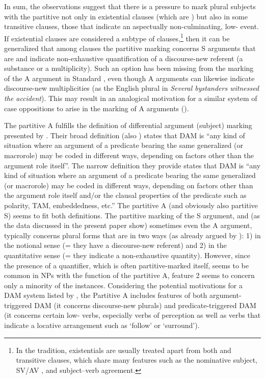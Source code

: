 \documentclass[output=paper]{LSP/langsci}
\begin{document}
In sum, the observations suggest that there is a pressure to mark  plural subjects with the partitive not only in existential clauses (which are ) but also in some transitive clauses, \ie those that indicate an aspectually non-culminating, low- event. If existential clauses are considered a subtype of  clauses,\footnote{In the  tradition, existentials are usually treated apart from both  and transitive clauses, which share many features such as the nominative subject, SV/AV , and subject–verb agreement.} then it can be generalized that among  clauses the partitive marking concerns S arguments that are  and indicate non-exhaustive quantification of a discourse-new referent (a substance or a multiplicity). Such an option has been missing from the marking of the A argument in Standard , even though A arguments can likewise indicate discourse-new multiplicities (as the English  plural in \textit{Several bystanders witnessed the accident}). This may result in an analogical motivation for a similar system of case oppositions to arise in the marking of A arguments (\cf \citealt[336–338]{Serzant2013Rise}).

The  partitive A fulfills the definition of differential argument (subject) marking presented by . Their broad definition (\cf also \citealt{Woolford2008Differential}) states that DAM is “any kind of situation where an argument of a predicate bearing the same generalized  (or macrorole) may be coded in different ways, depending on factors other than the argument role itself”. The narrow definition they provide states that DAM is “any kind of situation where an argument of a predicate bearing the same generalized  (or macrorole) may be coded in different ways, depending on factors other than the argument role itself and/or the clausal properties of the predicate such as polarity, TAM, embeddedness, etc.” The  partitive A (and obviously also partitive S) seems to fit both definitions. The partitive marking of the S argument, and (as the data discussed in the present paper show) sometimes even the A argument, typically concerns plural forms that are  in two ways (as already argued by \citealt{Siro1957Suomen}): 1) in the notional sense (= they have a discourse-new referent) and 2) in the quantitative sense (= they indicate a non-exhaustive quantity). However, since the presence of a quantifier, which is often partitive-marked itself, seems to be common in NPs with the function of the partitive A, feature 2 seems to concern only a minority of the instances. Considering the potential motivations for a DAM system listed by \citet{Witzlacketal2017Differential}, the  Partitive A includes features of both argument-triggered DAM (it concerns  discourse-new plurals) and predicate-triggered DAM (it concerns certain low- verbs, especially verbs of perception as well as verbs that indicate a locative arrangement such as ‘follow’ or ‘surround’). 
\end{document}

